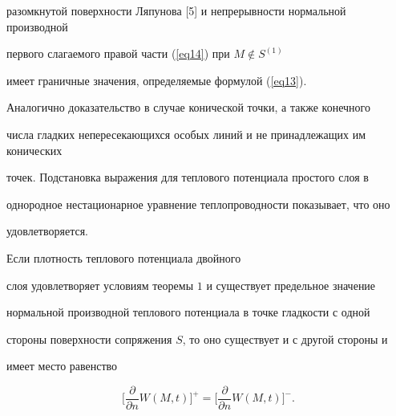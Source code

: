 \begin{pf}
разомкнутой поверхности Ляпунова [5] и непрерывности нормальной производной 


первого слагаемого правой части (\ref{eq14}) при $M \notin S^{({1})}$ 


имеет граничные значения, определяемые формулой (\ref{eq13}).





Аналогично доказательство в случае конической точки, а также конечного 


числа гладких непересекающихся особых линий и не принадлежащих им конических 


точек. Подстановка выражения для теплового потенциала простого слоя в 


однородное нестационарное уравнение теплопроводности показывает, что оно 


удовлетворяется.


\end{pf}








\begin{thm}


Если плотность теплового потенциала двойного 


слоя удовлетворяет условиям теоремы $1$ и существует предельное значение 


нормальной производной теплового потенциала в точке гладкости с одной 


стороны поверхности сопряжения $S$, то оно существует и с другой стороны и 


имеет место равенство


\begin{equation*}




\bigg[{\frac{{\partial}}{{\partial n}}W ({M,t})}\bigg]^{+} 


= \bigg[{\frac{{\partial}}{{\partial n}}W ({M,t})}\bigg]^{-}.


\end{equation*}


\end{thm}











